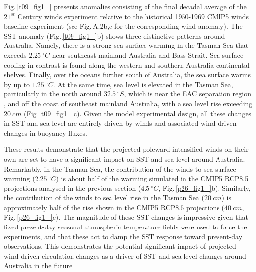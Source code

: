 \documentclass[draft,linenumbers]{agujournal2018}
\begin{document}
Fig.\,\ref{t09_fig1_} presents anomalies consisting of the final decadal average of the $21^{st}$ Century winds experiment relative to the historical 1950-1969 CMIP5 winds baseline experiment (see Fig.\,A.2b,c for the corresponding wind anomaly). The SST anomaly (Fig.\,\ref{t09_fig1_}b) shows three distinctive patterns around Australia. Namely, there is a strong sea surface warming in the Tasman Sea that exceeds $2.25\ ^{\circ}C$ near southeast mainland Australia and Bass Strait. Sea surface cooling in contrast is found along the western and southern Australia continental shelves. Finally, over the oceans further south of Australia, the sea surface warms by up to $1.25\ ^{\circ}C$. At the same time, sea level is elevated in the Tasman Sea, particularly in the north around $32.5\ ^{\circ}S$, which is near the EAC separation region \citep{Godfrey1980}, and off the coast of southeast mainland Australia, with a sea level rise exceeding $20\ cm$ (Fig.\,\ref{t09_fig1_}c). Given the model experimental design, all these changes in SST and sea-level are entirely driven by winds and associated wind-driven changes in buoyancy fluxes.

These results demonstrate that the projected poleward intensified winds on their own are set to have a significant impact on SST and sea level around Australia. Remarkably, in the Tasman Sea, the contribution of the winds to sea surface warming ($2.25\ ^{\circ}C$) is about half of the warming simulated in the CMIP5 RCP8.5 projections analysed in the previous section ($4.5\ ^{\circ}C$, Fig.\,\ref{p26_fig1_}b). Similarly, the contribution of the winds to sea level rise in the Tasman Sea ($20\ cm$) is approximately half of the rise shown in the CMIP5 RCP8.5 projections ($40\ cm$, Fig.\,\ref{p26_fig1_}c). The magnitude of these SST changes is impressive given that fixed present-day seasonal atmospheric temperature fields were used to force the experiments, and that these act to damp the SST response toward present-day observations. This demonstrates the potential significant impact of projected wind-driven circulation changes as a driver of SST and sea level changes around Australia in the future.
\end{document}
